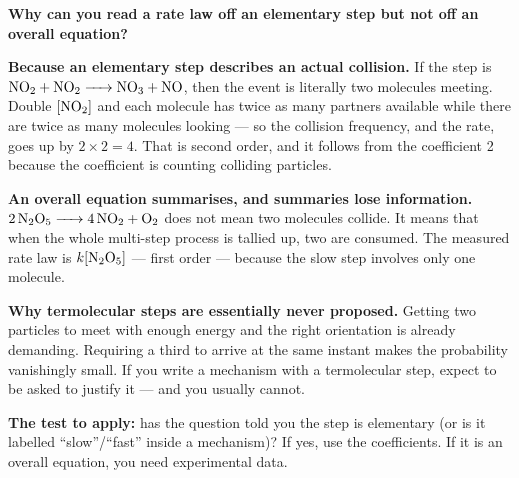 \documentclass{apchem-worksheet}
\begin{document}
\begin{workedexample}
\textbf{Why can you read a rate law off an elementary step but not off
an overall equation?}

\textbf{Because an elementary step describes an actual collision.} If
the step is $\ce{NO2 + NO2 -> NO3 + NO}$, then the event is literally
two  molecules meeting. Double $[\ce{NO2}]$ and each molecule
has twice as many partners available while there are twice as many
molecules looking --- so the collision frequency, and the rate, goes up
by $2 \times 2 = 4$. That is second order, and it follows from the
coefficient 2 because the coefficient is counting colliding particles.

\textbf{An overall equation summarises, and summaries lose
information.} $\ce{2N2O5 -> 4NO2 + O2}$ does not mean two 
molecules collide. It means that when the whole multi-step process is
tallied up, two are consumed. The measured rate law is
$k[\ce{N2O5}]$ --- first order --- because the slow step involves only
one molecule.

\textbf{Why termolecular steps are essentially never proposed.} Getting
two particles to meet with enough energy and the right orientation is
already demanding. Requiring a third to arrive at the same instant makes
the probability vanishingly small. If you write a mechanism with a
termolecular step, expect to be asked to justify it --- and you usually
cannot.

\textbf{The test to apply:} has the question told you the step is
elementary (or is it labelled ``slow''/``fast'' inside a mechanism)? If
yes, use the coefficients. If it is an overall equation, you need
experimental data.
\end{workedexample}
\end{document}
